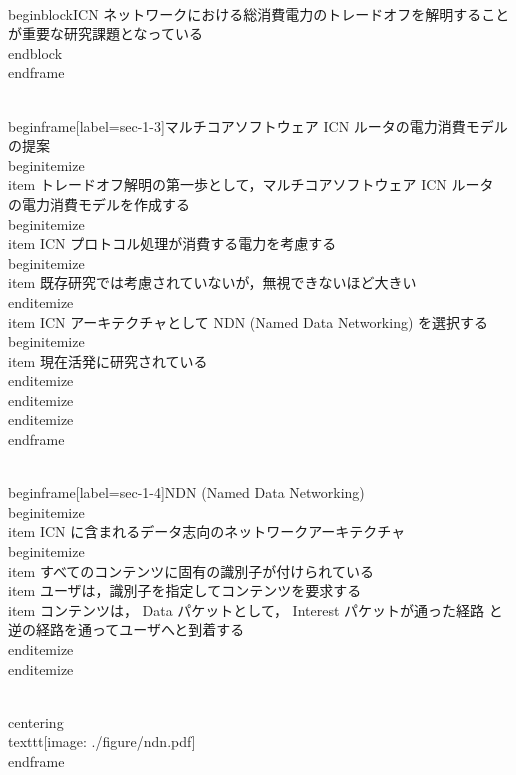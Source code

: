 {\\begin{block}{ICN ネットワークにおける総消費電力のトレードオフを解明することが重要な研究課題となっている}%
\\end{block}
\\end{frame}

\\begin{frame}[label=sec-1-3]{マルチコアソフトウェア ICN ルータの電力消費モデルの提案}
\\begin{itemize}
\\item トレードオフ解明の第一歩として，マルチコアソフトウェア ICN ルータ
の電力消費モデルを作成する
\\begin{itemize}
\\item ICN プロトコル処理が消費する電力を考慮する
\\begin{itemize}
\\item 既存研究では考慮されていないが，無視できないほど大きい
\\end{itemize}
\\item ICN アーキテクチャとして NDN (Named Data Networking) を選択する
\\begin{itemize}
\\item 現在活発に研究されている
\\end{itemize}
\\end{itemize}
\\end{itemize}
\\end{frame}

\\begin{frame}[label=sec-1-4]{NDN (Named Data Networking)}
\\begin{itemize}
\\item ICN に含まれるデータ志向のネットワークアーキテクチャ
\\begin{itemize}
\\item すべてのコンテンツに固有の識別子が付けられている
\\item ユーザは，識別子を指定してコンテンツを要求する
\\item コンテンツは， Data パケットとして， Interest パケットが通った経路
と逆の経路を通ってユーザへと到着する
\\end{itemize}
\\end{itemize}

\\centering
\\texttt{[image: ./figure/ndn.pdf]}
\\end{frame}

}
